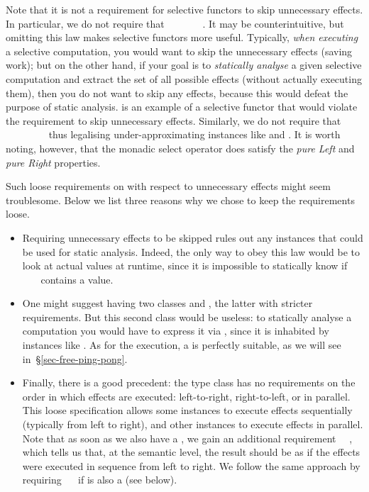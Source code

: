 {Note that it is not a requirement for selective functors to skip unnecessary
effects. In particular, we do not require that
~~~~~\hs{=}~~. It may be
counterintuitive, but omitting this law makes selective functors more useful.
Typically, \emph{when executing} a selective computation, you would want to skip
the unnecessary effects (saving work); but on the other hand, if your goal is to
\emph{statically analyse} a given selective computation and extract the set of
all possible effects (without actually executing them), then you do not want to
skip any effects, because this would defeat the purpose of static analysis.
 is an example of a selective functor that would violate the
requirement to skip unnecessary effects. Similarly, we do not require that
~~~~~\hs{=}~~~
thus legalising under-approximating instances like  and
. It is worth noting, however, that the monadic select operator
 does satisfy the \emph{pure Left} and \emph{pure Right} properties.

Such loose requirements on  with respect to unnecessary effects might
seem troublesome. Below we list three reasons why we chose to keep the
requirements loose.
\begin{itemize}
    \item Requiring unnecessary effects to be skipped rules out any instances
    that could be used for static analysis. Indeed, the only way to obey this
    law would be to look at actual values at runtime, since it is impossible to
    statically know if ~~~ contains a 
    value.
    \item One might suggest having two classes  and
    , the latter with stricter requirements. But this second
    class would be useless: to statically analyse a computation you would have
    to express it via , since it is inhabited by instances like
    . As for the execution, a  is perfectly suitable, as we
    will see in~\S\ref{sec-free-ping-pong}.
    \item Finally, there is a good precedent: the  type class
    has no requirements on the order in which effects are executed:
    left-to-right, right-to-left, or in parallel. This loose specification
    allows some instances to execute effects sequentially (typically from left
    to right), and other instances to execute effects in parallel. Note that as
    soon as we also have a , we gain an additional requirement
    \hs{(<*>)}~\hs{=}~, which tells us that, at the semantic level, the
    result should be as if the effects were executed in sequence from left to
    right. We follow the same approach by requiring
    ~\hs{=}~ if  is also a  (see below).
\end{itemize}

}

